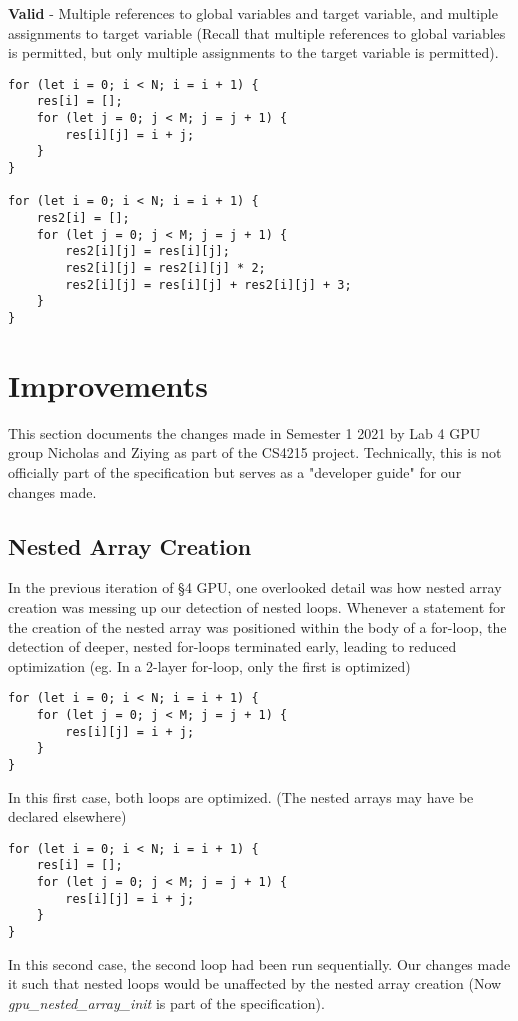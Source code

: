 \textbf{Valid} - Multiple references to global variables and target variable, and multiple assignments to target variable (Recall that multiple references to global variables is permitted, but only multiple assignments to the target variable is permitted).
\begin{verbatim}
for (let i = 0; i < N; i = i + 1) {
    res[i] = [];
    for (let j = 0; j < M; j = j + 1) {
        res[i][j] = i + j;
    }
}

for (let i = 0; i < N; i = i + 1) {
    res2[i] = [];
    for (let j = 0; j < M; j = j + 1) {
        res2[i][j] = res[i][j];
        res2[i][j] = res2[i][j] * 2;
        res2[i][j] = res[i][j] + res2[i][j] + 3;
    }
}
\end{verbatim}

\section*{Improvements}

This section documents the changes made in Semester 1 2021 by Lab 4 GPU group Nicholas and Ziying as part of the CS4215 project. Technically, this is not officially part of the specification but serves as a "developer guide" for our changes made.

\subsection*{Nested Array Creation}

In the previous iteration of \S 4 GPU, one overlooked detail was how nested array creation was messing up our detection of nested loops. Whenever a statement for the creation of the nested array was positioned within the body of a for-loop, the detection of deeper, nested for-loops terminated early, leading to reduced optimization (eg. In a 2-layer for-loop, only the first is optimized)
 
\begin{verbatim}
for (let i = 0; i < N; i = i + 1) {
    for (let j = 0; j < M; j = j + 1) {
        res[i][j] = i + j;
    }
}
\end{verbatim}
In this first case, both loops are optimized. (The nested arrays may have be declared elsewhere)

\begin{verbatim}
for (let i = 0; i < N; i = i + 1) {
    res[i] = [];
    for (let j = 0; j < M; j = j + 1) {
        res[i][j] = i + j;
    }
}
\end{verbatim}
In this second case, the second loop had been run sequentially. Our changes made it such that nested loops would be unaffected by the nested array creation (Now \textit{gpu\_nested\_array\_init} is part of the specification).



